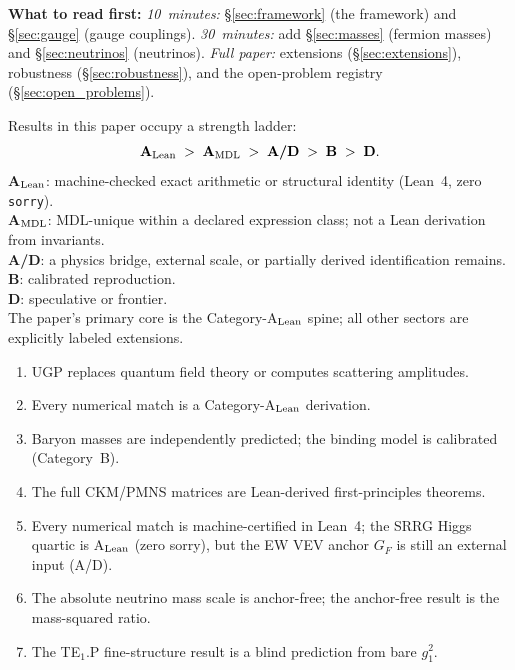 \documentclass[11pt]{article}
\theoremstyle{remark}
\begin{document}
\begin{tcolorbox}[colback=blue!3,colframe=blue!40!black,
  title={\textbf{Executive Summary}},
  fonttitle=\bfseries,left=6pt,right=6pt,top=5pt,bottom=5pt]
\medskip
\textbf{What to read first:}
\emph{10~minutes:} \S\ref{sec:framework} (the framework) and \S\ref{sec:gauge} (gauge couplings).
\emph{30~minutes:} add \S\ref{sec:masses} (fermion masses) and \S\ref{sec:neutrinos} (neutrinos).
\emph{Full paper:} extensions (\S\ref{sec:extensions}), robustness (\S\ref{sec:robustness}), and the open-problem registry (\S\ref{sec:open_problems}).
\end{tcolorbox}


\begin{tcolorbox}[colback=gray!4,colframe=gray!50!black,
  title={\textbf{How to read claim strength in this paper}},
  fonttitle=\bfseries,left=6pt,right=6pt,top=5pt,bottom=5pt]
\small
Results in this paper occupy a strength ladder:
\[
\textbf{A}_{\rm Lean}
\;>\;
\textbf{A}_{\rm MDL}
\;>\;
\textbf{A/D}
\;>\;
\textbf{B}
\;>\;
\textbf{D}.
\]
\textbf{A}$_{\rm Lean}$: machine-checked exact arithmetic or structural identity (Lean~4, zero \texttt{sorry}).\\
\textbf{A}$_{\rm MDL}$: MDL-unique within a declared expression class; not a Lean derivation from invariants.\\
\textbf{A/D}: a physics bridge, external scale, or partially derived identification remains.\\
\textbf{B}: calibrated reproduction.\\
\textbf{D}: speculative or frontier.\\
The paper's primary core is the Category-A$_{\rm Lean}$ spine; all other sectors are explicitly labeled extensions.
\end{tcolorbox}

\begin{tcolorbox}[colback=red!3,colframe=red!40!black,
  title={\textbf{What this paper is not claiming}},
  fonttitle=\bfseries,left=6pt,right=6pt,top=5pt,bottom=5pt]
\small
\begin{enumerate}[leftmargin=1.4em,itemsep=0.1em]
\item UGP replaces quantum field theory or computes scattering amplitudes.
\item Every numerical match is a Category-A$_{\rm Lean}$ derivation.
\item Baryon masses are independently predicted; the binding model is calibrated (Category~B).
\item The full CKM/PMNS matrices are Lean-derived first-principles theorems.
\item Every numerical match is machine-certified in Lean~4; the SRRG Higgs quartic is A$_{\rm Lean}$ (zero sorry), but the EW VEV anchor $G_F$ is still an external input (A/D).
\item The absolute neutrino mass scale is anchor-free; the anchor-free result is the mass-squared ratio.
\item The TE$_1$.P fine-structure result is a blind prediction from bare $g_1^2$.
\end{enumerate}
\end{tcolorbox}
\end{document}
